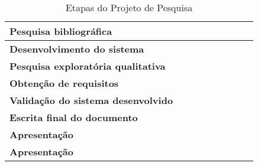 \begin{table}[H]
{\begin{tabular}{@{}l|l|l|l|l|l|l|l|l|@{}}
      \multicolumn{1}{|l|}{\textbf{Pesquisa bibliográfica}}            & \cellcolor[HTML]{A4C2F4} & \cellcolor[HTML]{A4C2F4} & \cellcolor[HTML]{A4C2F4} &                          &                          &                          &                          &                          \\ \midrule
      \multicolumn{1}{|l|}{\textbf{Desenvolvimento do sistema}}        & \cellcolor[HTML]{A4C2F4} & \cellcolor[HTML]{A4C2F4} & \cellcolor[HTML]{A4C2F4} & \cellcolor[HTML]{A4C2F4} & \cellcolor[HTML]{A4C2F4} & \cellcolor[HTML]{A4C2F4} & \cellcolor[HTML]{A4C2F4} &                          \\ \midrule
      \multicolumn{1}{|l|}{\textbf{Pesquisa exploratória qualitativa}} &                          & \cellcolor[HTML]{A4C2F4} & \cellcolor[HTML]{A4C2F4} & \cellcolor[HTML]{A4C2F4} &                          &                          &                          &                          \\ \midrule
      \multicolumn{1}{|l|}{\textbf{Obtenção de requisitos}}            &                          & \cellcolor[HTML]{A4C2F4} & \cellcolor[HTML]{A4C2F4} & \cellcolor[HTML]{A4C2F4} &                          &                          &                          &                          \\ \midrule
      \multicolumn{1}{|l|}{\textbf{Validação do sistema desenvolvido}} &                          &                          & \cellcolor[HTML]{A4C2F4} & \cellcolor[HTML]{A4C2F4} & \cellcolor[HTML]{A4C2F4} & \cellcolor[HTML]{A4C2F4} & \cellcolor[HTML]{A4C2F4} &                          \\ \midrule
      \multicolumn{1}{|l|}{\textbf{Escrita final do documento}}        &                          &                          &                          &                          &                          &                          & \cellcolor[HTML]{A4C2F4} & \cellcolor[HTML]{A4C2F4} \\ \midrule
      \multicolumn{1}{|l|}{\textbf{Apresentação}}                      &                          &                          &                          &                          &                          &                          &                          & \cellcolor[HTML]{A4C2F4} \\ \midrule
      \multicolumn{1}{|l|}{\textbf{Apresentação}}                      &                          &                          &                          &                          &                          &                          &                          & \cellcolor[HTML]{A4C2F4} \\ \bottomrule
    \end{tabular}%
 }
  \caption{Etapas do Projeto de Pesquisa}
  \label{tab:etapas}
\end{table}